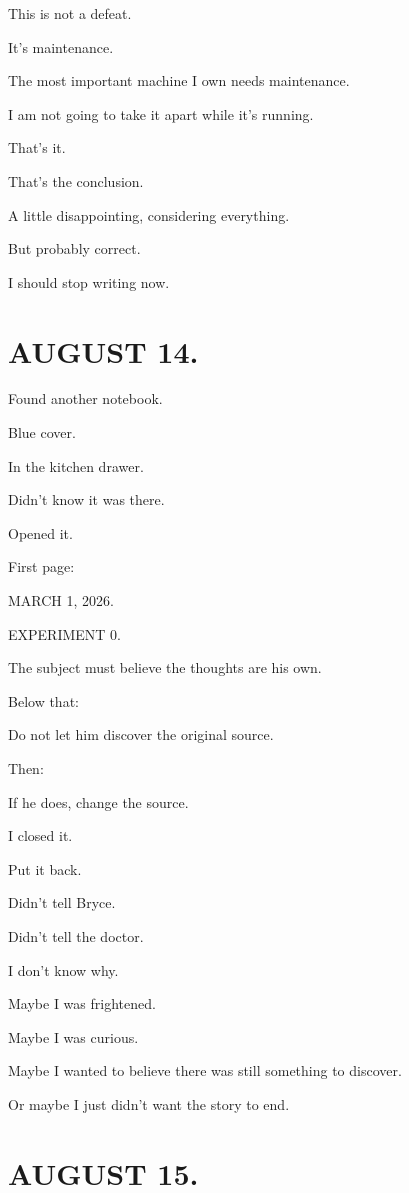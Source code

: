 \documentclass[11pt,oneside]{book}
\begin{document}
This is not a defeat.

It's maintenance.

The most important machine I own needs maintenance.

I am not going to take it apart while it's running.

That's it.

That's the conclusion.

A little disappointing, considering everything.

But probably correct.

I should stop writing now.

\section*{AUGUST 14.}

Found another notebook.

Blue cover.

In the kitchen drawer.

Didn't know it was there.

Opened it.

First page:

MARCH 1, 2026.

EXPERIMENT 0.

The subject must believe the thoughts are his own.

Below that:

Do not let him discover the original source.

Then:

If he does, change the source.

I closed it.

Put it back.

Didn't tell Bryce.

Didn't tell the doctor.

I don't know why.

Maybe I was frightened.

Maybe I was curious.

Maybe I wanted to believe there was still something to discover.

Or maybe I just didn't want the story to end.

\section*{AUGUST 15.}
\end{document}
